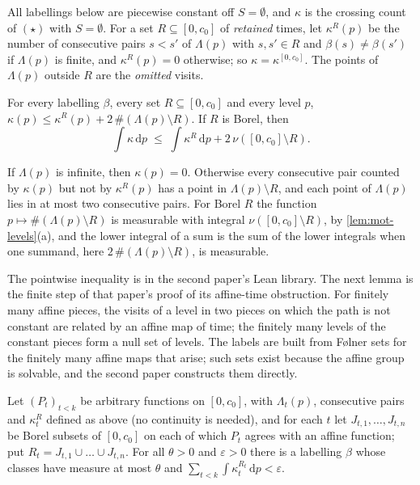 All labellings below are piecewise constant off $S=\emptyset$, and $\kappa$ is the crossing count of $(\star)$ with
$S=\emptyset$. For a set $R\subseteq[0,c_0]$ of \emph{retained} times, let $\kappa^R(p)$ be the number of consecutive
pairs $s<s'$ of $\Lambda(p)$ with $s,s'\in R$ and $\beta(s)\ne\beta(s')$ if $\Lambda(p)$ is finite, and $\kappa^R(p)=0$
otherwise; so $\kappa=\kappa^{[0,c_0]}$. The points of $\Lambda(p)$ outside $R$ are the \emph{omitted} visits.

\begin{lemma}\label{lem:mot-delete}
\notformalized
For every labelling $\beta$, every set $R\subseteq[0,c_0]$ and every level $p$,
$\kappa(p)\le\kappa^R(p)+2\,\#(\Lambda(p)\setminus R)$. If $R$ is Borel, then
\[
  \int\kappa\,\mathrm dp\;\le\;\int\kappa^R\,\mathrm dp+2\,\nu([0,c_0]\setminus R).
\]
\end{lemma}

\begin{informalproof}
If $\Lambda(p)$ is infinite, then $\kappa(p)=0$. Otherwise every consecutive pair counted by $\kappa(p)$ but not by
$\kappa^R(p)$ has a point in $\Lambda(p)\setminus R$, and each point of $\Lambda(p)$ lies in at most two consecutive
pairs. For Borel $R$ the function $p\mapsto\#(\Lambda(p)\setminus R)$ is measurable with integral
$\nu([0,c_0]\setminus R)$, by \cref{lem:mot-levels}(a), and the lower integral of a sum is the sum of the lower integrals
when one summand, here $2\,\#(\Lambda(p)\setminus R)$, is measurable.
\end{informalproof}

The pointwise inequality is  in the second paper's Lean
library. The next lemma is the finite step of that paper's proof of its affine-time obstruction. For finitely many affine
pieces, the visits of a level in two pieces on which the path is not constant are related by an affine map of time; the
finitely many levels of the constant pieces form a null set of levels. The labels are built from F\o lner sets for the
finitely many affine maps that arise; such sets exist because the affine group is solvable, and the second paper
constructs them directly.

\begin{lemma}\label{lem:mot-finite-labels}
Let $(P_t)_{t<k}$ be arbitrary functions on $[0,c_0]$, with $\Lambda_t(p)$, consecutive pairs and $\kappa_t^{R}$ defined
as above (no continuity is needed), and for each $t$ let $J_{t,1},\dots,J_{t,n}$ be Borel subsets of
$[0,c_0]$ on each of which $P_t$ agrees with an affine function; put $R_t=J_{t,1}\cup\dots\cup J_{t,n}$. For all
$\theta>0$ and $\varepsilon>0$ there is a labelling $\beta$ whose classes have measure at most $\theta$ and
$\sum_{t<k}\int\kappa_t^{R_t}\,\mathrm dp<\varepsilon$.
\end{lemma}


